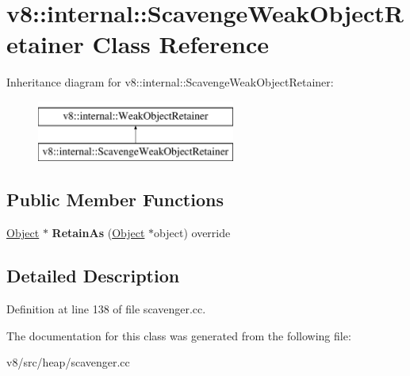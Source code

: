 \hypertarget{classv8_1_1internal_1_1ScavengeWeakObjectRetainer}{}\section{v8\+:\+:internal\+:\+:Scavenge\+Weak\+Object\+Retainer Class Reference}
\label{classv8_1_1internal_1_1ScavengeWeakObjectRetainer}
Inheritance diagram for v8\+:\+:internal\+:\+:Scavenge\+Weak\+Object\+Retainer\+:\begin{figure}[H]
\begin{center}
\leavevmode
\includegraphics[height=2.000000cm]{classv8_1_1internal_1_1ScavengeWeakObjectRetainer}
\end{center}
\end{figure}
\subsection*{Public Member Functions}
\begin{DoxyCompactItemize}
\item 
\mbox{\label{classv8_1_1internal_1_1ScavengeWeakObjectRetainer_adfb5ef197ac6273c027f5e57cd45a523}} 
\mbox{\hyperlink{classv8_1_1internal_1_1Object}{Object}} $\ast$ {\bfseries Retain\+As} (\mbox{\hyperlink{classv8_1_1internal_1_1Object}{Object}} $\ast$object) override
\end{DoxyCompactItemize}


\subsection{Detailed Description}


Definition at line 138 of file scavenger.\+cc.



The documentation for this class was generated from the following file\+:\begin{DoxyCompactItemize}
\item 
v8/src/heap/scavenger.\+cc\end{DoxyCompactItemize}

